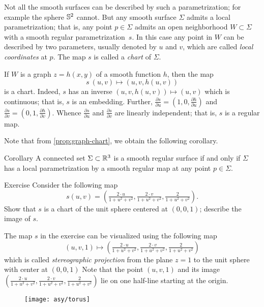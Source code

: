 Not all the smooth surfaces can be described by such a parametrization;
for example the sphere $\mathbb{S}^2$ cannot.
But any smooth surface $\Sigma$ admits a local parametrization; that is, any point $p\in\Sigma$ admits an open neighborhood $W\subset \Sigma$ with a smooth regular parametrization~$s$.
In this case any point in $W$ can be described by two parameters, usually denoted by $u$ and $v$, 
which are called \emph{local coordinates} at $p$.
The map $s$ is called a \emph{chart} of $\Sigma$.

If $W$ is a graph $z=h(x,y)$ of a smooth function $h$, then the map 
\[s\:(u,v)\mapsto (u,v,h(u,v))\] is a chart.
Indeed, $s$ has an inverse $(u,v,h(u,v))\mapsto (u,v)$ which is continuous;
that is, $s$ is an embedding.
Further,
$\tfrac{\partial s}{\partial u}=(1,0,\tfrac{\partial h}{\partial u})$ and $\tfrac{\partial s}{\partial v}=(0,1,\tfrac{\partial h}{\partial v})$. 
Whence $\tfrac{\partial s}{\partial u}$ and $\tfrac{\partial s}{\partial v}$ are linearly independent;
that is, $s$ is a regular map.

Note that from \ref{prop:graph-chart}, we obtain the following corollary.

\begin{thm}{Corollary}\label{cor:reg-parmeterization}
A connected set $\Sigma\subset \mathbb{R}^3$ is a smooth regular surface if and only if $\Sigma$ has a local parametrization by a smooth regular map at any point $p\in\Sigma$.
\end{thm}


\begin{thm}{Exercise}\label{ex:inversion-chart}
Consider the following map 
\[s(u,v)=(\tfrac{2\cdot u}{1+u^2+v^2},\tfrac{2\cdot v}{1+u^2+v^2},\tfrac{2}{1+u^2+v^2}).\]
Show that $s$ is a chart of the unit sphere centered at $(0,0,1)$; describe the image of $s$.
\end{thm}

The map $s$ in the exercise can be visualized using the following map
\[(u,v,1)\mapsto (\tfrac{2\cdot u}{1+u^2+v^2},\tfrac{2\cdot v}{1+u^2+v^2},\tfrac{2}{1+u^2+v^2})\]
which is called \emph{stereographic projection} from the plane $z=1$ to the unit sphere with center at $(0,0,1)$
Note that the point $(u,v,1)$ and its image $(\tfrac{2\cdot u}{1+u^2+v^2},\tfrac{2\cdot v}{1+u^2+v^2},\tfrac{2}{1+u^2+v^2})$ lie on one half-line starting at the origin. %

\begin{wrapfigure}{o}{40 mm}
\vskip-4mm
\centering
\texttt{[image: asy/torus]}
\vskip-3mm
\end{wrapfigure}

